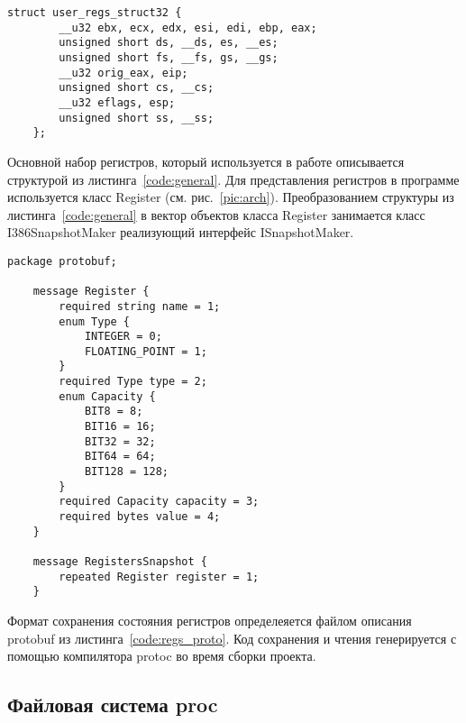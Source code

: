 \begin{lstlisting}[caption=Основной набор регистров, label=code:general]
    struct user_regs_struct32 {
        __u32 ebx, ecx, edx, esi, edi, ebp, eax;
        unsigned short ds, __ds, es, __es;
        unsigned short fs, __fs, gs, __gs;
        __u32 orig_eax, eip;
        unsigned short cs, __cs;
        __u32 eflags, esp;
        unsigned short ss, __ss;
    };
\end{lstlisting}

Основной набор регистров, который используется в работе описывается структурой из листинга~\ref{code:general}. Для представления регистров в программе используется класс Register (см. рис.~\ref{pic:arch}). Преобразованием структуры из листинга~\ref{code:general} в вектор объектов класса Register занимается класс I386SnapshotMaker реализующий интерфейс ISnapshotMaker.

\begin{lstlisting}[caption=Формат сохранения регистров, label=code:regs_proto]
    package protobuf;

    message Register {
        required string name = 1;
        enum Type {
            INTEGER = 0;
            FLOATING_POINT = 1;
        }
        required Type type = 2;
        enum Capacity {
            BIT8 = 8;
            BIT16 = 16;
            BIT32 = 32;
            BIT64 = 64;
            BIT128 = 128;
        }
        required Capacity capacity = 3;
        required bytes value = 4;
    }

    message RegistersSnapshot {
        repeated Register register = 1;
    }
\end{lstlisting}

Формат сохранения состояния регистров определеяется файлом описания protobuf из листинга~\ref{code:regs_proto}. Код сохранения и чтения генерируется с помощью компилятора protoc во время сборки проекта.

\subsection{Файловая система proc}

